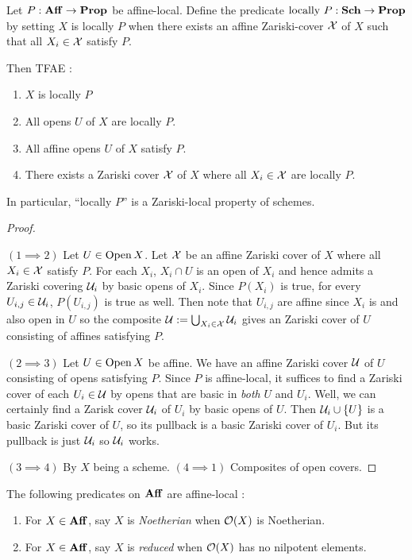 \documentclass[../main.tex]{subfiles}
\begin{document}
\begin{prop}
  
  Let $P : \mathbf{Aff} \to \mathbf{Prop}$ be affine-local.
  Define the predicate $\text{locally }P : \mathbf{Sch} \to \mathbf{Prop}$ by
  setting $X$ is locally $P$ when 
  there exists an affine Zariski-cover $\mathcal{X}$ of $X$ such that 
  all $X_i \in \mathcal{X}$ satisfy $P$.

  Then TFAE : 
  \begin{enumerate}
    \item $X$ is locally $P$
    \item All opens $U$ of $X$ are locally $P$.
    \item All affine opens $U$ of $X$ satisfy $P$.
    \item There exists a Zariski cover $\mathcal{X}$ of $X$ where
    all $X_i \in \mathcal{X}$ are locally $P$.
  \end{enumerate}
  In particular, ``locally $P$'' is a Zariski-local property of schemes.
\end{prop}
\begin{proof}~
  
  $(1\implies 2)$
  Let $U \in \operatorname{Open} X$.
  Let $\mathcal{X}$ be an affine Zariski cover of $X$ where 
  all $X_i \in \mathcal{X}$ satisfy $P$.
  For each $X_i$, $X_i \cap U$ is an open of $X_i$ and hence 
  admits a Zariski covering $\mathcal{U}_i$ by basic opens of $X_i$.
  Since $P(X_i)$ is true, for every $U_{i,j} \in \mathcal{U}_i$,
  $P(U_{i,j})$ is true as well. 
  Then note that $U_{i,j}$ are affine since $X_i$ is and also open in $U$
  so the composite $\mathcal{U} := \bigcup_{X_i \in \mathcal{X}} \mathcal{U}_i$ gives an 
  Zariski cover of $U$ consisting of affines satisfying $P$.

  $(2 \implies 3)$
  Let $U \in \operatorname{Open} X$ be affine.
  We have an affine Zariski cover $\mathcal{U}$ of $U$
  consisting of opens satisfying $P$.
  Since $P$ is affine-local, 
  it suffices to find a Zariski cover of each $U_i \in \mathcal{U}$ by 
  opens that are basic in \emph{both} $U$ and $U_i$.
  Well, we can certainly find a Zarisk cover $\mathcal{U}_i$ of $U_i$ 
  by basic opens of $U$.
  Then $\mathcal{U}_i \cup \left\{U\right\}$ is a basic Zariski cover of $U$, 
  so its pullback is a basic Zariski cover of $U_i$.
  But its pullback is just $\mathcal{U}_i$ so $\mathcal{U}_i$ works.

  $(3 \implies 4)$ By $X$ being a scheme. 
  $(4 \implies 1)$ Composites of open covers.

\end{proof}

\begin{prop}
  
  The following predicates on $\mathbf{Aff}$ are affine-local : 
  \begin{enumerate}
    \item For $X \in \mathbf{Aff}$, say $X$ is \emph{Noetherian} when 
    $\mathcal{O}(X)$ is Noetherian.
    \item For $X \in \mathbf{Aff}$, say $X$ is \emph{reduced} when 
    $\mathcal{O}(X)$ has no nilpotent elements.
  \end{enumerate}
\end{prop}
\end{document}
